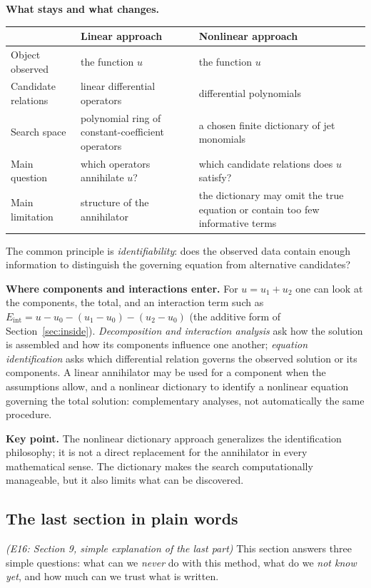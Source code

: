 \documentclass[11pt]{article}
\theoremstyle{plain}
\theoremstyle{definition}
\theoremstyle{remark}
\newcommand{\Eint}{E_{\mathrm{int}}}        %
\begin{document}
\medskip\textbf{What stays and what changes.}
\begin{center}\small
\begin{tabular}{@{}L{2.9cm}L{5.6cm}L{5.8cm}@{}}
\toprule
 & Linear approach & Nonlinear approach\\\midrule
Object observed & the function $u$ & the function $u$\\
Candidate relations & linear differential operators & differential polynomials\\
Search space & polynomial ring of constant-coefficient operators & a chosen finite dictionary of jet monomials\\
Main question & which operators annihilate $u$? & which candidate relations does $u$ satisfy?\\
Main limitation & structure of the annihilator & the dictionary may omit the true equation or contain too few informative terms\\
\bottomrule
\end{tabular}
\end{center}
The common principle is \emph{identifiability}: does the observed data contain enough information to distinguish the governing equation from alternative candidates?

\medskip\textbf{Where components and interactions enter.} For $u=u_1+u_2$ one can look at the components, the total, and an interaction term such as $\Eint=u-u_0-(u_1-u_0)-(u_2-u_0)$ (the additive form of Section~\ref{sec:inside}). \emph{Decomposition and interaction analysis} ask how the solution is assembled and how its components influence one another; \emph{equation identification} asks which differential relation governs the observed solution or its components. A linear annihilator may be used for a component when the assumptions allow, and a nonlinear dictionary to identify a nonlinear equation governing the total solution: complementary analyses, not automatically the same procedure.

\medskip\textbf{Key point.} The nonlinear dictionary approach generalizes the identification philosophy; it is not a direct replacement for the annihilator in every mathematical sense. The dictionary makes the search computationally manageable, but it also limits what can be discovered.

\subsection{The last section in plain words}\label{expl:E16}
\noindent\emph{(E16: Section 9, simple explanation of the last part)}
This section answers three simple questions: what can we \emph{never} do with this method, what do we \emph{not know yet}, and how much can we trust what is written.
\end{document}
